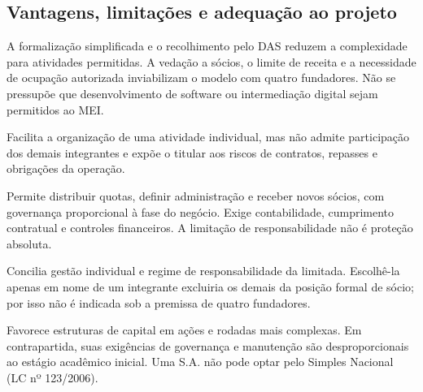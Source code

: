 \clearpage
\subsection{Vantagens, limitações e adequação ao projeto}
\begin{description}[style=nextline,leftmargin=0cm]
\item[MEI.] A formalização simplificada e o recolhimento pelo DAS reduzem a complexidade para atividades permitidas. A vedação a sócios, o limite de receita e a necessidade de ocupação autorizada inviabilizam o modelo com quatro fundadores. Não se pressupõe que desenvolvimento de software ou intermediação digital sejam permitidos ao MEI.
\item[EI.] Facilita a organização de uma atividade individual, mas não admite participação dos demais integrantes e expõe o titular aos riscos de contratos, repasses e obrigações da operação.
\item[LTDA.] Permite distribuir quotas, definir administração e receber novos sócios, com governança proporcional à fase do negócio. Exige contabilidade, cumprimento contratual e controles financeiros. A limitação de responsabilidade não é proteção absoluta.
\item[SLU.] Concilia gestão individual e regime de responsabilidade da limitada. Escolhê-la apenas em nome de um integrante excluiria os demais da posição formal de sócio; por isso não é indicada sob a premissa de quatro fundadores.
\item[S.A.] Favorece estruturas de capital em ações e rodadas mais complexas. Em contrapartida, suas exigências de governança e manutenção são desproporcionais ao estágio acadêmico inicial. Uma S.A. não pode optar pelo Simples Nacional (LC nº 123/2006).
\end{description}

